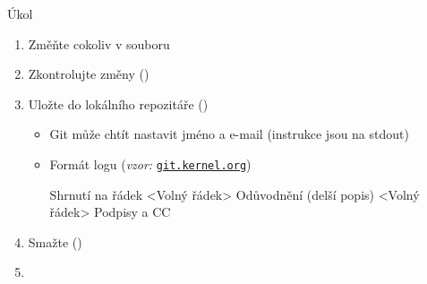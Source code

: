 \begin{frame}[fragile]{Úkol}

  \begin{enumerate}
    \item Změňte cokoliv v souboru 
    \item Zkontrolujte změny ()

    \item Uložte do lokálního repozitáře ()
    \begin{itemize}
      \item Git může chtít nastavit jméno a e-mail (instrukce jsou na stdout)
      \item Formát logu (\emph{vzor:} \href{https://git.kernel.org/cgit/linux/kernel/git/torvalds/linux.git/log}{\nolinkurl{git.kernel.org}})
      \begin{semiverbatim}
	Shrnutí na řádek
	<Volný řádek>
	Odůvodnění (delší popis)
	<Volný řádek>
	Podpisy a CC
      \end{semiverbatim}\vspace{-\baselineskip}
    \end{itemize}

    \pause

    \item Smažte  ()
    \item {}

  \end{enumerate}

\end{frame}

